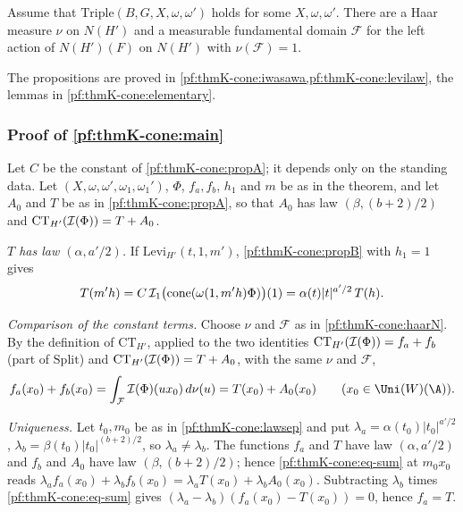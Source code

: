\begin{lemma}\label{pf:thmK-cone:haarN}
Assume that $\mathrm{Triple}(B,G,X,\omega,\omega')$ holds for some $X,\omega,\omega'$.  There are a Haar measure $\nu$ on
$N(H')$ and a measurable fundamental domain $\mathcal F$ for the left action of $N(H')(F)$ on $N(H')$ with
$\nu(\mathcal F)=1$.
\end{lemma}

The propositions are proved in \cref{pf:thmK-cone:iwasawa,pf:thmK-cone:levilaw}, the lemmas in
\cref{pf:thmK-cone:elementary}.

\subsubsection{Proof of \texorpdfstring{\cref{pf:thmK-cone:main}}{the theorem}}\label{pf:thmK-cone:proofmain}
Let $C$ be the constant of \cref{pf:thmK-cone:propA}; it depends only on the standing data.  Let
$(X,\omega,\omega',\omega_1,\omega_1')$, $\Phi$, $f_a,f_b$, $h_1$ and $m$ be as in the theorem, and let $A_0$ and $T$ be
as in \cref{pf:thmK-cone:propA}, so that $A_0$ has law $(\beta,(b+2)/2)$ and $\mathrm{CT}_{H'}(\mathcal{I}(\Phi))=T+A_0$.

\emph{$T$ has law $(\alpha,a'/2)$.}  If $\mathrm{Levi}_{H'}(t,1,m')$, \cref{pf:thmK-cone:propB} with $h_1=1$ gives
\[
  T(m'h)=C\,\mathcal{I}_1\bigl(\operatorname{cone}(\omega(1,m'h)\Phi)\bigr)(1)=\alpha(t)|t|^{a'/2}\,T(h).
\]

\emph{Comparison of the constant terms.}  Choose $\nu$ and $\mathcal F$ as in \cref{pf:thmK-cone:haarN}.  By the
definition of $\mathrm{CT}_{H'}$, applied to the two identities $\mathrm{CT}_{H'}(\mathcal{I}(\Phi))=f_a+f_b$ (part of
$\mathrm{Split}$) and $\mathrm{CT}_{H'}(\mathcal{I}(\Phi))=T+A_0$, with the same $\nu$ and $\mathcal F$,
\begin{equation}\label{pf:thmK-cone:eq-sum}
  f_a(x_0)+f_b(x_0)=\int_{\mathcal F}\thmKconeI(\Phi)(ux_0)\,d\nu(u)=T(x_0)+A_0(x_0)\qquad(x_0\in\Uni(W)(\A)).
\end{equation}

\emph{Uniqueness.}  Let $t_0,m_0$ be as in \cref{pf:thmK-cone:lawsep} and put $\lambda_a=\alpha(t_0)|t_0|^{a'/2}$,
$\lambda_b=\beta(t_0)|t_0|^{(b+2)/2}$, so $\lambda_a\neq\lambda_b$.  The functions $f_a$ and $T$ have law
$(\alpha,a'/2)$ and $f_b$ and $A_0$ have law $(\beta,(b+2)/2)$; hence \eqref{pf:thmK-cone:eq-sum} at $m_0x_0$ reads
$\lambda_af_a(x_0)+\lambda_bf_b(x_0)=\lambda_aT(x_0)+\lambda_bA_0(x_0)$.  Subtracting $\lambda_b$ times
\eqref{pf:thmK-cone:eq-sum} gives $(\lambda_a-\lambda_b)(f_a(x_0)-T(x_0))=0$, hence $f_a=T$.

